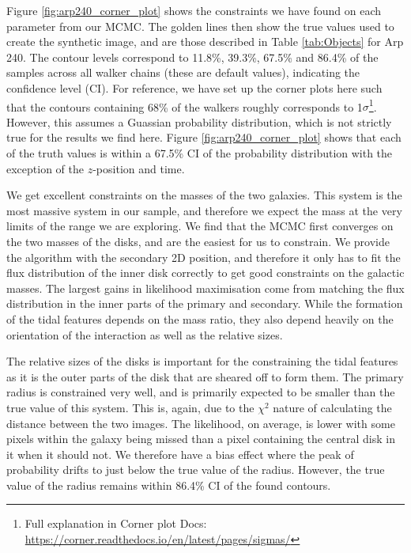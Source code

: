 Figure \ref{fig:arp240_corner_plot} shows the constraints we have found on each parameter from our MCMC. The golden lines then show the true values used to create the synthetic image, and are those described in Table \ref{tab:Objects} for Arp 240. The contour levels correspond to 11.8\%, 39.3\%, 67.5\% and 86.4\% of the samples across all walker chains (these are default values), indicating the confidence level (CI). For reference, we have set up the corner plots here such that the contours containing 68\% of the walkers roughly corresponds to 1$\sigma$\footnote{Full explanation in Corner plot Docs: \url{https://corner.readthedocs.io/en/latest/pages/sigmas/}}. However, this assumes a Guassian probability distribution, which is not strictly true for the results we find here. Figure \ref{fig:arp240_corner_plot} shows that each of the truth values is within a 67.5\% CI of the probability distribution with the exception of the $z$-position and time.

We get excellent constraints on the masses of the two galaxies. This system is the most massive system in our sample, and therefore we expect the mass at the very limits of the range we are exploring. We find that the MCMC first converges on the two masses of the disks, and are the easiest for us to constrain. We provide the algorithm with the secondary 2D position, and therefore it only has to fit the flux distribution of the inner disk correctly to get good constraints on the galactic masses. The largest gains in likelihood maximisation come from matching the flux distribution in the inner parts of the primary and secondary. While the formation of the tidal features depends on the mass ratio, they also depend heavily on the orientation of the interaction as well as the relative sizes.

The relative sizes of the disks is important for the constraining the tidal features as it is the outer parts of the disk that are sheared off to form them. The primary radius is constrained very well, and is primarily expected to be smaller than the true value of this system. This is, again, due to the $\chi^{2}$ nature of calculating the distance between the two images. The likelihood, on average, is lower with some pixels within the galaxy being missed than a pixel containing the central disk in it when it should not. We therefore have a bias effect where the peak of probability drifts to just below the true value of the radius. However, the true value of the radius remains within 86.4\% CI of the found contours. 

